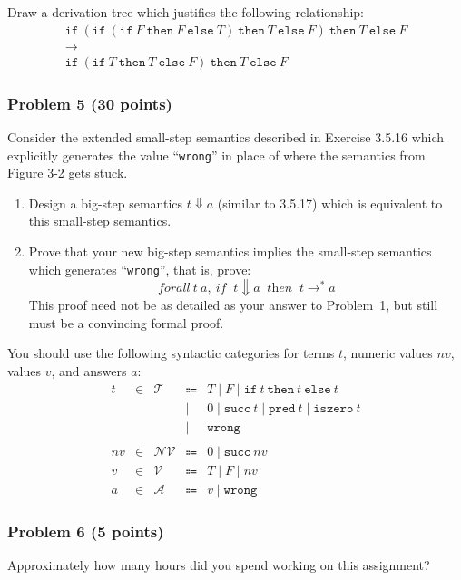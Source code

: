 \documentclass{article}
\begin{document}
Draw a derivation tree which justifies the following relationship:
\begin{gather*} 
  \texttt{if}
   \ (\texttt{if}
     \ (\texttt{if}\ F\ \texttt{then}\ F\ \texttt{else}\ T)
     \ \texttt{then}\ T
     \ \texttt{else}\ F)
   \ \texttt{then}\ T
   \ \texttt{else}\ F 
   \\ \longrightarrow
   \\ 
  \texttt{if}
   \ (\texttt{if}
     \ T
     \ \texttt{then}\ T
     \ \texttt{else}\ F)
   \ \texttt{then}\ T
   \ \texttt{else}\ F 
\end{gather*}

\subsubsection*{Problem 5 (30 points)}

Consider the extended small-step semantics described in Exercise 3.5.16 which
explicitly generates the value ``\texttt{wrong}'' in place of where the
semantics from Figure 3-2 gets stuck.
\begin{enumerate}
\item
  Design a big-step semantics $t \Downarrow a$ (similar to 3.5.17) which is
  equivalent to this small-step semantics.
\item
  Prove that your new big-step semantics implies the small-step semantics which
    generates ``\texttt{wrong}'', that is, prove:
    \[ \textit{forall}\ t\ a,
       \ \textit{if}\;\;t \Downarrow a\;\;\textit{then}\;\;t \longrightarrow^* a 
    \]
    This proof need not be as detailed as your answer to Problem~1, but still
    must be a convincing formal proof.
\end{enumerate}
You should use the following syntactic categories for terms $t$, numeric values
$nv$, values $v$, and answers $a$:
\[ \begin{array}{rcrcl}
     t {}&{} \in {}&{} \mathcal{T} {}&{} \Coloneqq {}&{} T \mid F \mid \texttt{if}\ t\ \texttt{then}\ t\ \texttt{else}\ t
  \\   {}&{}     {}&{}             {}&{} \mid      {}&{} 0 \mid \texttt{succ}\ t \mid \texttt{pred}\ t \mid \texttt{iszero}\ t
  \\   {}&{}     {}&{}             {}&{} \mid      {}&{} \texttt{wrong}
  \\ 
  \\  nv {}&{} \in {}&{} \mathcal{NV} {}&{} \Coloneqq {}&{} 0 \mid \texttt{succ}\ nv
  \\  v  {}&{} \in {}&{} \mathcal{V}  {}&{} \Coloneqq {}&{} T \mid F \mid nv
  \\  a  {}&{} \in {}&{} \mathcal{A}  {}&{} \Coloneqq {}&{} v \mid \texttt{wrong}
  \
   \end{array}
\]


\subsubsection*{Problem 6 (5 points)}

Approximately how many hours did you spend working on this assignment?
\end{document}
